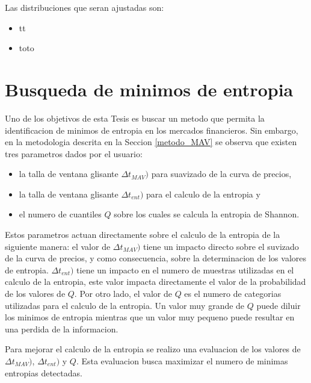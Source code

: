 Las distribuciones que seran ajustadas son:

\begin{itemize}
	\item tt
	\item toto
\end{itemize}



\section{Busqueda de minimos de entropia}

Uno de los objetivos de esta Tesis es buscar un metodo que permita la identificacion de minimos de entropia en los mercados financieros.
Sin embargo, en la metodologia descrita en la Seccion \ref{metodo_MAV} se observa que existen tres parametros dados por el usuario:
\begin{itemize}
	\item la talla de ventana glisante $\Delta t_{MAV})$ para suavizado de la curva de precios,
	\item la talla de ventana glisante $\Delta t_{ent})$ para el calculo de la entropia y
	\item el numero de cuantiles $Q$ sobre los cuales se calcula la entropia de Shannon.
\end{itemize}

Estos parametros actuan directamente sobre el calculo de la entropia de la siguiente manera: 
el valor de $\Delta t_{MAV})$ tiene un impacto directo sobre el suvizado de la curva de precios, y como consecuencia, sobre la determinacion de los valores de entropia. 
$\Delta t_{ent})$ tiene un impacto en el numero de muestras utilizadas en el calculo de la entropia, este valor impacta directamente el valor de la probabilidad de los valores de $Q$. 
Por otro lado, el valor de $Q$ es el numero de categorias utilizadas para el calculo de la entropia. 
Un valor muy grande de $Q$ puede diluir los minimos de entropia mientras que un valor muy pequeno puede resultar en una perdida de la informacion.

Para mejorar el calculo de la entropia se realizo una evaluacion de los valores de $\Delta t_{MAV})$, $\Delta t_{ent})$ y $Q$.
Esta evaluacion busca maximizar el numero de minimas entropias detectadas.


	

